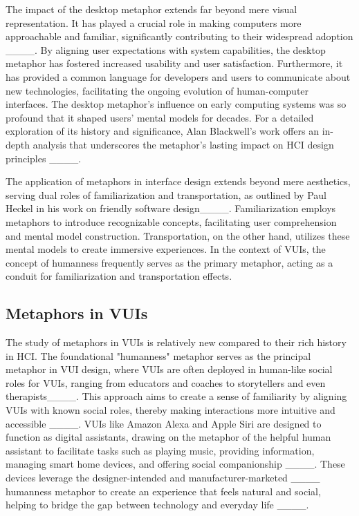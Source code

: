 The impact of the desktop metaphor extends far beyond mere visual representation. It has played a crucial role in making computers more approachable and familiar, significantly contributing to their widespread adoption ____. By aligning user expectations with system capabilities, the desktop metaphor has fostered increased usability and user satisfaction. Furthermore, it has provided a common language for developers and users to communicate about new technologies, facilitating the ongoing evolution of human-computer interfaces. The desktop metaphor's influence on early computing systems was so profound that it shaped users' mental models for decades. For a detailed exploration of its history and significance, Alan Blackwell's work offers an in-depth analysis that underscores the metaphor's lasting impact on HCI design principles ____.




The application of metaphors in interface design extends beyond mere aesthetics, serving dual roles of familiarization and transportation, as outlined by Paul Heckel in his work on friendly software design____. Familiarization employs metaphors to introduce recognizable concepts, facilitating user comprehension and mental model construction. Transportation, on the other hand, utilizes these mental models to create immersive experiences. In the context of VUIs, the concept of humanness frequently serves as the primary metaphor, acting as a conduit for familiarization and transportation effects.



\subsection{Metaphors in VUIs}

The study of metaphors in VUIs is relatively new compared to their rich history in HCI. The foundational "humanness" metaphor serves as the principal metaphor in VUI design, where VUIs are often deployed in human-like social roles for VUIs, ranging from educators and coaches to storytellers and even therapists____. This approach aims to create a sense of familiarity by aligning VUIs with known social roles, thereby making interactions more intuitive and accessible ____. VUIs like Amazon Alexa and Apple Siri are designed to function as digital assistants, drawing on the metaphor of the helpful human assistant to facilitate tasks such as playing music, providing information, managing smart home devices, and offering social companionship ____. These devices leverage the designer-intended and manufacturer-marketed ____ humanness metaphor to create an experience that feels natural and social, helping to bridge the gap between technology and everyday life ____.

